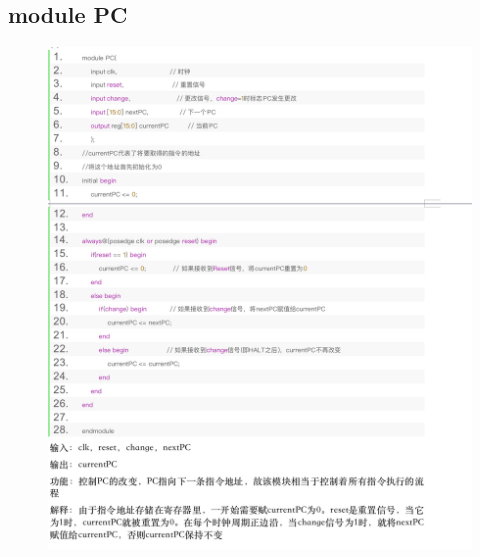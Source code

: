 \documentclass{article}
\begin{document}
\subsection{module PC}
\begin{figure}[H]
    \centering
    \includegraphics[width=1\textwidth]{pic/10.png}
   
    \end{figure}
\end{document}
